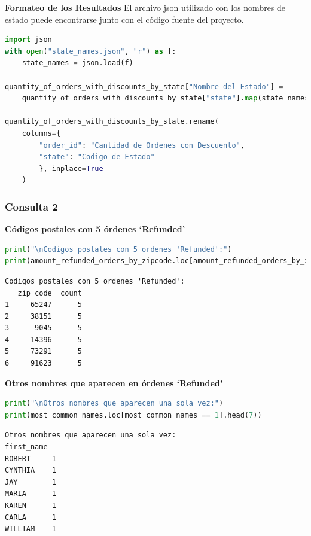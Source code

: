 \textbf{Formateo de los Resultados}
El archivo json utilizado con los nombres de estado puede encontrarse junto con el código fuente del proyecto.
\label{anexo:output_formateo_resultados}
\begin{lstlisting}[language=Python, xleftmargin=70pt, xrightmargin=70pt]
import json
with open("state_names.json", "r") as f:
    state_names = json.load(f)

quantity_of_orders_with_discounts_by_state["Nombre del Estado"] = 
    quantity_of_orders_with_discounts_by_state["state"].map(state_names)

quantity_of_orders_with_discounts_by_state.rename(
    columns={
        "order_id": "Cantidad de Ordenes con Descuento",
        "state": "Codigo de Estado"
        }, inplace=True
    )
\end{lstlisting}

\subsubsection{Consulta 2}

\textbf{Códigos postales con 5 órdenes `Refunded'}

\label{anexo:output_codigos_postales_refunded}
\begin{lstlisting}[language=Python, xleftmargin=35pt, xrightmargin=35pt]
print("\nCodigos postales con 5 ordenes 'Refunded':")
print(amount_refunded_orders_by_zipcode.loc[amount_refunded_orders_by_zipcode["count"] == 5])
\end{lstlisting}
\begin{lstlisting}[style=console, aboveskip=0pt, xleftmargin=145pt, xrightmargin=145pt]
Codigos postales con 5 ordenes 'Refunded':
   zip_code  count
1     65247      5
2     38151      5
3      9045      5
4     14396      5
5     73291      5
6     91623      5
\end{lstlisting}

\textbf{Otros nombres que aparecen en órdenes `Refunded'}

\label{anexo:nombres_mas_comunes}
\begin{lstlisting}[language=Python, xleftmargin=105pt, xrightmargin=105pt]
print("\nOtros nombres que aparecen una sola vez:")
print(most_common_names.loc[most_common_names == 1].head(7))
\end{lstlisting}
\begin{lstlisting}[style=console, aboveskip=0pt, xleftmargin=145pt, xrightmargin=145pt]
Otros nombres que aparecen una sola vez:
first_name
ROBERT     1
CYNTHIA    1
JAY        1
MARIA      1
KAREN      1
CARLA      1
WILLIAM    1
\end{lstlisting}

